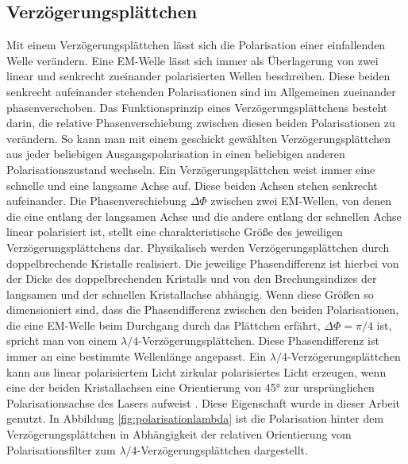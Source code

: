\documentclass[a4paper, titlepage,  ngerman]{book}
\begin{document}
	\subsection{Verzögerungsplättchen}
	Mit einem Verzögerungsplättchen lässt sich die Polarisation einer einfallenden Welle verändern. Eine EM-Welle lässt sich immer als Überlagerung von zwei linear und senkrecht zueinander polarisierten Wellen beschreiben. Diese beiden senkrecht aufeinander stehenden Polarisationen sind im Allgemeinen zueinander phasenverschoben. Das Funktionsprinzip eines Verzögerungsplättchens besteht darin, die relative Phasenverschiebung zwischen diesen beiden Polarisationen zu verändern. So kann man mit einem geschickt gewählten Verzögerungsplättchen aus jeder beliebigen Ausgangspolarisation in einen beliebigen anderen Polarisationszustand wechseln. Ein Verzögerungsplättchen weist immer eine schnelle und eine langsame Achse auf. Diese beiden Achsen stehen senkrecht aufeinander. Die Phasenverschiebung $\Delta\Phi$ zwischen zwei EM-Wellen, von denen die eine entlang der langsamen Achse und die andere entlang der schnellen Achse linear polarisiert ist, stellt eine charakteristische Größe des jeweiligen Verzögerungsplättchens dar. Physikalisch  werden Verzögerungsplättchen durch doppelbrechende Kristalle realisiert. Die jeweilige Phasendifferenz ist hierbei von der Dicke des doppelbrechenden Kristalls und von den Brechungsindizes der langsamen und der schnellen Kristallachse abhängig. Wenn diese Größen so dimensioniert sind, dass die Phasendifferenz zwischen den beiden Polarisationen, die eine EM-Welle beim Durchgang durch das Plättchen erfährt, $\Delta \Phi = \pi /4 $ ist, spricht man von einem  $\lambda /4$-Verzögerungsplättchen. Diese Phasendifferenz ist immer an eine bestimmte Wellenlänge angepasst.  Ein $\lambda /4$-Verzögerungsplättchen kann aus linear polarisiertem Licht zirkular polarisiertes Licht erzeugen, wenn eine der beiden Kristallachsen eine Orientierung von 45° zur ursprünglichen Polarisationsachse des Lasers aufweist \cite{Hecht.2018}. Diese Eigenschaft wurde in dieser Arbeit genutzt. In Abbildung \ref{fig:polarisationlambda} ist die Polarisation hinter dem Verzögerungsplättchen in Abhängigkeit der relativen Orientierung vom Polarisationsfilter zum $\lambda /4$-Verzögerungsplättchen dargestellt. 
\end{document}
